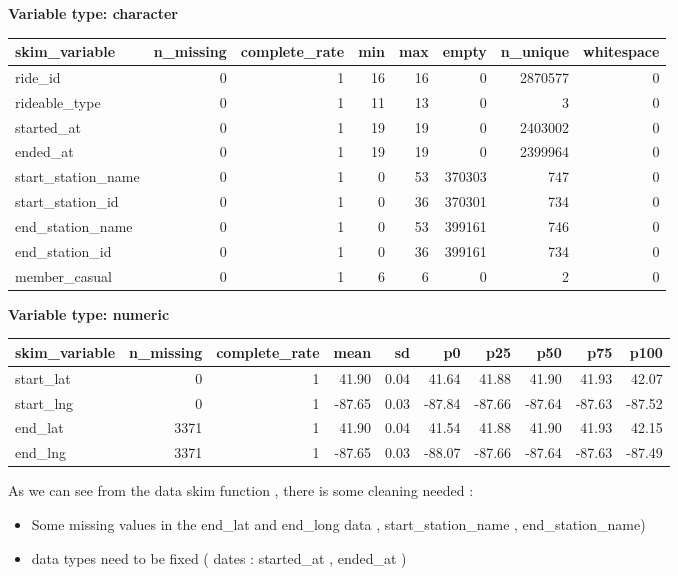 \documentclass[
]{article}
\begin{document}
\textbf{Variable type: character}

\begin{longtable}[]{@{}lrrrrrrr@{}}
\toprule
skim\_variable & n\_missing & complete\_rate & min & max & empty &
n\_unique & whitespace \\
\midrule
\endhead
ride\_id & 0 & 1 & 16 & 16 & 0 & 2870577 & 0 \\
rideable\_type & 0 & 1 & 11 & 13 & 0 & 3 & 0 \\
started\_at & 0 & 1 & 19 & 19 & 0 & 2403002 & 0 \\
ended\_at & 0 & 1 & 19 & 19 & 0 & 2399964 & 0 \\
start\_station\_name & 0 & 1 & 0 & 53 & 370303 & 747 & 0 \\
start\_station\_id & 0 & 1 & 0 & 36 & 370301 & 734 & 0 \\
end\_station\_name & 0 & 1 & 0 & 53 & 399161 & 746 & 0 \\
end\_station\_id & 0 & 1 & 0 & 36 & 399161 & 734 & 0 \\
member\_casual & 0 & 1 & 6 & 6 & 0 & 2 & 0 \\
\bottomrule
\end{longtable}

\textbf{Variable type: numeric}

\begin{longtable}[]{@{}lrrrrrrrrr@{}}
\toprule
skim\_variable & n\_missing & complete\_rate & mean & sd & p0 & p25 &
p50 & p75 & p100 \\
\midrule
\endhead
start\_lat & 0 & 1 & 41.90 & 0.04 & 41.64 & 41.88 & 41.90 & 41.93 &
42.07 \\
start\_lng & 0 & 1 & -87.65 & 0.03 & -87.84 & -87.66 & -87.64 & -87.63 &
-87.52 \\
end\_lat & 3371 & 1 & 41.90 & 0.04 & 41.54 & 41.88 & 41.90 & 41.93 &
42.15 \\
end\_lng & 3371 & 1 & -87.65 & 0.03 & -88.07 & -87.66 & -87.64 & -87.63
& -87.49 \\
\bottomrule
\end{longtable}

As we can see from the data skim function , there is some cleaning
needed :

\begin{itemize}
\item
  Some missing values in the end\_lat and end\_long data ,
  start\_station\_name , end\_station\_name)
\item
  data types need to be fixed ( dates : started\_at , ended\_at )
\end{itemize}
\end{document}
